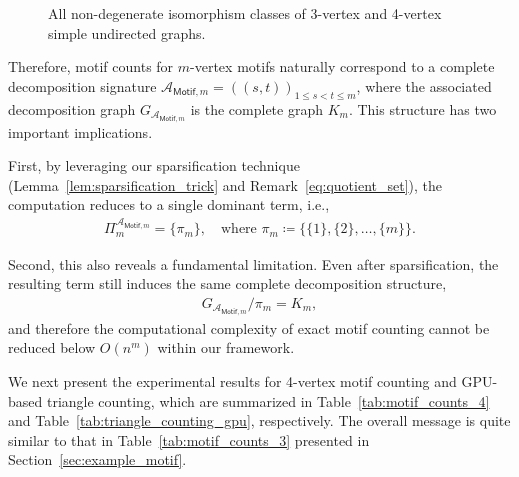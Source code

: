 \documentclass[sn-mathphys, natbib=false]{sn-jnl}
\theoremstyle{plain}
\theoremstyle{definition}
\newcommand{\partition}{\Pi}
\newcommand{\completegraphp}[1]{K_{#1}}
\newcommand{\graphform}[1]{G_{#1}}
\newcommand{\less}{O}
\def\calA{\mathcal{A}}
\begin{document}
\begin{bibunit}[agsm]
\begin{figure}[ht]
    \caption{All non-degenerate isomorphism classes of 3-vertex and 4-vertex simple undirected graphs.}
    \label{fig:motif-3-4}
\end{figure}

Therefore, motif counts for $m$-vertex motifs naturally correspond to a complete decomposition signature $\calA_{\mathsf{Motif},m} = ((s,t))_{1 \le s < t \le m}$, where the associated decomposition graph $\graphform{\calA_{\mathsf{Motif},m}}$ is the complete graph $\completegraphp{m}$. 
This structure has two important implications. 

First, by leveraging our sparsification technique (Lemma~\ref{lem:sparsification_trick} and Remark~\ref{eq:quotient_set}), the computation reduces to a single dominant term, i.e.,
\begin{align*}
\partition_m^{\calA_{\mathsf{Motif},m}} 
= \{ \pi_m \}, 
\quad \text{where } 
\pi_m \coloneqq \big\{ \{1\}, \{2\}, \ldots, \{m\} \big\}.
\end{align*}

Second, this also reveals a fundamental limitation. 
Even after sparsification, the resulting term still induces the same complete decomposition structure,
\begin{align*}
\graphform{\calA_{\mathsf{Motif},m}} / \pi_m 
= \completegraphp{m},
\end{align*}
and therefore the computational complexity of exact motif counting cannot be reduced below $\less(n^m)$ within our framework.

We next present the experimental results for 4-vertex motif counting and GPU-based triangle counting, which are summarized in Table~\ref{tab:motif_counts_4} and Table~\ref{tab:triangle_counting_gpu}, respectively. The overall message is quite similar to that in Table~\ref{tab:motif_counts_3} presented in Section~\ref{sec:example_motif}.


\end{bibunit}
\end{document}
